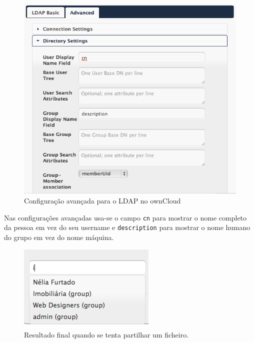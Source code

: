 \documentclass[12pt,a4paper]{report}
\begin{document}
\begin{figure}[h]
\begin{center}
\includegraphics[width=\textwidth]{figs/oc-ldap-advanced.png}
\end{center}
\caption{Configuração avançada para o LDAP no ownCloud}
\label{fig:ocadvanced}
\end{figure}

Nas configurações avançadas usa-se o campo \texttt{cn} para mostrar o nome completo da pessoa em vez do seu username e \texttt{description} para mostrar o nome humano do grupo em vez do nome máquina.

\clearpage

\begin{figure}[h]
\begin{center}
\includegraphics{figs/oc-sharing.png}
\end{center}
\caption{Resultado final quando se tenta partilhar um ficheiro.}
\label{fig:ocsharing}
\end{figure}
\end{document}
